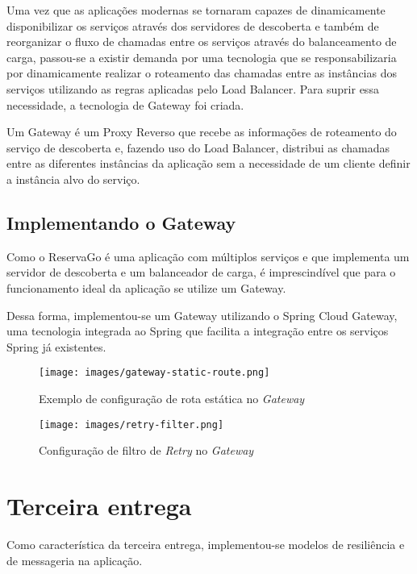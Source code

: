 \documentclass[12pt, openright, oneside, a4paper, article,
  section=TITLE
]{abntex2}
\begin{document}
Uma vez que as aplicações modernas se tornaram capazes de dinamicamente disponibilizar os serviços através dos servidores de descoberta e também de reorganizar o fluxo de chamadas entre os serviços através do balanceamento de carga, passou-se a existir demanda por uma tecnologia que se responsabilizaria por dinamicamente realizar o roteamento das chamadas entre as instâncias dos serviços utilizando as regras aplicadas pelo Load Balancer. Para suprir essa necessidade, a tecnologia de Gateway foi criada.  

Um Gateway é um Proxy Reverso que recebe as informações de roteamento do serviço de descoberta e, fazendo uso do Load Balancer, distribui as chamadas entre as diferentes instâncias da aplicação sem a necessidade de um cliente definir a instância alvo do serviço. 

\subsection{Implementando o Gateway}

Como o ReservaGo é uma aplicação com múltiplos serviços e que implementa um servidor de descoberta e um balanceador de carga, é imprescindível que para o funcionamento ideal da aplicação se utilize um Gateway.

Dessa forma, implementou-se um Gateway utilizando o Spring Cloud Gateway, uma tecnologia integrada ao Spring que facilita a integração entre os serviços Spring já existentes. 

\begin{figure}[htb]
  \begin{center}
    \texttt{[image: images/gateway-static-route.png]}
  \end{center}
  \caption{Exemplo de configuração de rota estática no \textit{Gateway}}
\end{figure}

\begin{figure}[htb]
  \begin{center}
    \texttt{[image: images/retry-filter.png]}
  \end{center}
  \caption{Configuração de filtro de \textit{Retry} no \textit{Gateway}}
\end{figure}

\section{Terceira entrega}

Como característica da terceira entrega, implementou-se modelos de resiliência e de messageria na aplicação.
\end{document}
